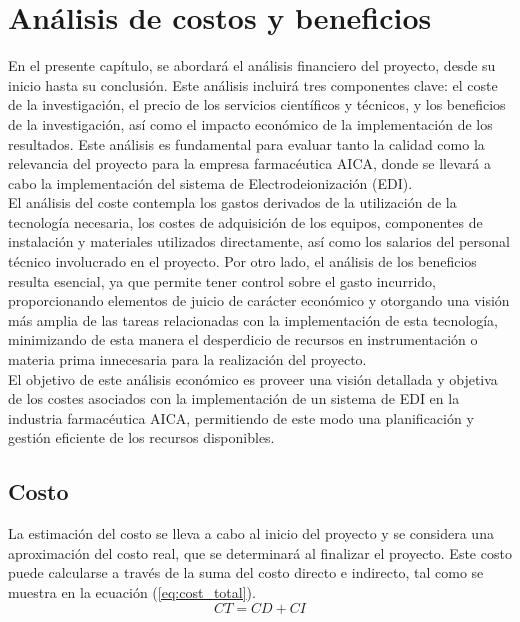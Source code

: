 \chapter{Análisis de costos y beneficios}
En el presente capítulo, se abordará el análisis financiero del proyecto, desde su inicio hasta su conclusión. Este análisis incluirá tres componentes clave: el coste de la investigación, el precio de los servicios científicos y técnicos, y los beneficios de la investigación, así como el impacto económico de la implementación de los resultados. Este análisis es fundamental para evaluar tanto la calidad como la relevancia del proyecto para la empresa farmacéutica AICA, donde se llevará a cabo la implementación del sistema de Electrodeionización (EDI).\\

El análisis del coste contempla los gastos derivados de la utilización de la tecnología necesaria, los costes de adquisición de los equipos, componentes de instalación y materiales utilizados directamente, así como los salarios del personal técnico involucrado en el proyecto. Por otro lado, el análisis de los beneficios resulta esencial, ya que permite tener control sobre el gasto incurrido, proporcionando elementos de juicio de carácter económico y otorgando una visión más amplia de las tareas relacionadas con la implementación de esta tecnología, minimizando de esta manera el desperdicio de recursos en instrumentación o materia prima innecesaria para la realización del proyecto.\\

El objetivo de este análisis económico es proveer una visión detallada y objetiva de los costes asociados con la implementación de un sistema de EDI en la industria farmacéutica AICA, permitiendo de este modo una planificación y gestión eficiente de los recursos disponibles.\\


\section{Costo}

La estimación del costo se lleva a cabo al inicio del proyecto y se considera una aproximación del costo real, que se determinará al finalizar el proyecto. Este costo puede calcularse a través de la suma del costo directo e indirecto, tal como se muestra en la ecuación (\ref{eq:cost_total}). \\

\begin{equation} 
\label{eq:cost_total}
CT = CD + CI 
\end{equation}

